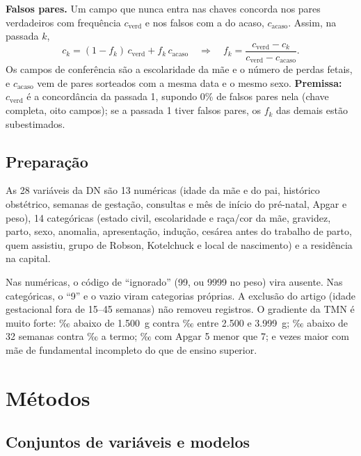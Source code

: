 \documentclass[12pt]{article}
\begin{document}
\textbf{Falsos pares.} Um campo que nunca entra nas chaves concorda nos pares verdadeiros com frequência $c_{\text{verd}}$ e nos falsos com a do acaso, $c_{\text{acaso}}$. Assim, na passada $k$,
\begin{equation}
c_k = (1-f_k)\,c_{\text{verd}} + f_k\,c_{\text{acaso}}
\quad\Rightarrow\quad
f_k = \frac{c_{\text{verd}} - c_k}{c_{\text{verd}} - c_{\text{acaso}}}.
\end{equation}
Os campos de conferência são a escolaridade da mãe e o número de perdas fetais, e $c_{\text{acaso}}$ vem de pares sorteados com a mesma data e o mesmo sexo. \textbf{Premissa:} $c_{\text{verd}}$ é a concordância da passada 1, supondo 0\% de falsos pares nela (chave completa, oito campos); se a passada 1 tiver falsos pares, os $f_k$ das demais estão subestimados.

\subsection{Preparação}

As 28 variáveis da DN são 13 numéricas (idade da mãe e do pai, histórico obstétrico, semanas de gestação, consultas e mês de início do pré-natal, Apgar e peso), 14 categóricas (estado civil, escolaridade e raça/cor da mãe, gravidez, parto, sexo, anomalia, apresentação, indução, cesárea antes do trabalho de parto, quem assistiu, grupo de Robson, Kotelchuck e local de nascimento) e a residência na capital.

Nas numéricas, o código de ``ignorado'' (99, ou 9999 no peso) vira ausente. Nas categóricas, o ``9'' e o vazio viram categorias próprias. A exclusão do artigo (idade gestacional fora de 15--45 semanas) não removeu registros. O gradiente da TMN é muito forte: \tmnPesoMuitoBaixo{}‰ abaixo de 1.500~g contra \tmnPesoNormal{}‰ entre 2.500 e 3.999~g; \tmnIgMuitoPrematuro{}‰ abaixo de 32 semanas contra \tmnIgTermo{}‰ a termo; \tmnApgarBaixo{}‰ com Apgar 5 menor que 7; e \razaoEscol{} vezes maior com mãe de fundamental incompleto do que de ensino superior.

\section{Métodos}

\subsection{Conjuntos de variáveis e modelos}
\end{document}
